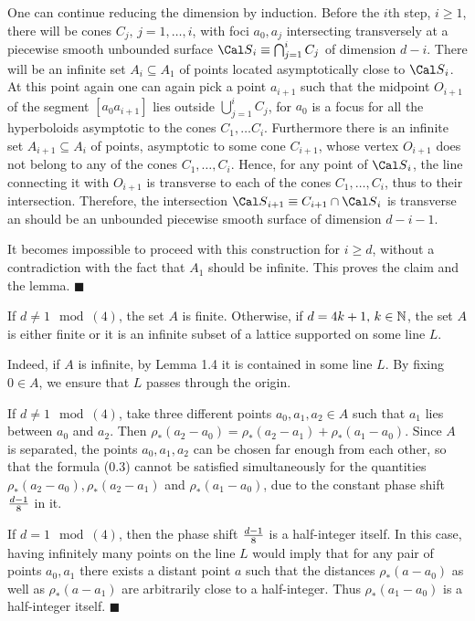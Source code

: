 One can continue reducing the dimension by induction. Before the
$i$th step, $i\geq 1$, there will be cones $C_j,\,j=1,\ldots,i$,
with foci $a_0,a_j$ intersecting transversely at a piecewise
smooth unbounded surface ${\Cal S}_i\equiv \bigcap_{j=1}^{i}C_j$
of dimension $d-i$. There will be an infinite set
$A_{i}\subseteq A_1$ of points located asymptotically close to
${\Cal S}_i$. At this point again one can again pick a point
$a_{i+1}$ such that the midpoint $O_{i+1}$ of the segment
$[a_0a_{i+1}]$  lies outside $\bigcup_{j=1}^{i} C_j$, for $a_0$
is a focus for all the hyperboloids asymptotic to the cones
$C_1,\ldots C_{i}$. Furthermore  there is an infinite set
$A_{i+1}\subseteq A_i$ of points, asymptotic to some cone
$C_{i+1}$, whose vertex $O_{i+1}$ does not belong to any of the
cones $C_1,\ldots,C_i$. Hence, for any point of ${\Cal S}_i$,
the line connecting it with $O_{i+1}$ is transverse to each of
the cones $C_1,\ldots,C_i$, thus to their intersection.
Therefore, the intersection ${\Cal S}_{i+1}\equiv
C_{i+1}\cap{\Cal S}_i$ is transverse an should be an unbounded
piecewise smooth surface of dimension $d-i-1$.

It  becomes impossible to proceed with this construction for
$i\geq d$, without a contradiction with the fact that $A_1$
should be infinite.  This proves the claim and the lemma.
$\blacksquare$

 If $d\neq 1 \mod (4)$, the set $A$ is
finite. Otherwise, if $d=4k+1,\,k\in {\Bbb N}$, the set $A$ is
either finite or it is an infinite subset of a lattice supported
on some line $L$. \endproclaim

Indeed, if $A$ is  infinite, by Lemma 1.4 it is contained in
some line $L$.  By fixing $0\in A$, we ensure that $L$ passes
through the origin.

If $d\neq 1 \mod(4)$, take three different points
$a_0,a_1,a_2\in A$ such that $a_1$  lies between $a_0$ and
$a_2$. Then $\rho_*(a_2-a_0)=\rho_*(a_2-a_1)+\rho_*(a_1-a_0)$.
Since $A$ is separated, the points $a_0,a_1,a_2$ can be chosen
far enough from each other, so that the formula (0.3) cannot be
satisfied simultaneously for the quantities $\rho_*(a_2-a_0),
\rho_*(a_2-a_1)$ and $\rho_*(a_1-a_0)$, due to the constant
phase shift ${d-1\over8}$ in it.

If $d=1 \mod(4)$, then the phase shift ${d-1\over8}$ is a
half-integer itself.  In this case, having infinitely many
points on the line $L$ would imply that for any pair of points
$a_0,a_1$ there exists a distant point $a$ such that the
distances $\rho_*(a-a_0)$ as well as  $\rho_*(a-a_1)$ are
arbitrarily close to a half-integer. Thus $\rho_*(a_1-a_0)$ is a
half-integer itself. $\blacksquare$


